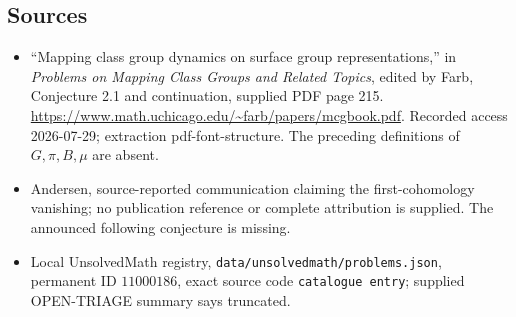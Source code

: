 \documentclass[11pt]{article}
\begin{document}
\subsection{Sources}
\begin{itemize}
\item ``Mapping class group dynamics on surface group representations,'' in \emph{Problems on Mapping Class Groups and Related Topics}, edited by Farb, Conjecture 2.1 and continuation, supplied PDF page 215. \url{https://www.math.uchicago.edu/~farb/papers/mcgbook.pdf}. Recorded access 2026-07-29; extraction pdf-font-structure. The preceding definitions of \(G,\pi,B,\mu\) are absent.
\item Andersen, source-reported communication claiming the first-cohomology vanishing; no publication reference or complete attribution is supplied. The announced following conjecture is missing.
\item Local UnsolvedMath registry, \texttt{data/unsolvedmath/problems.json}, permanent ID \(11000186\), exact source code \texttt{catalogue entry}; supplied OPEN-TRIAGE summary says truncated.
\end{itemize}
\end{document}
